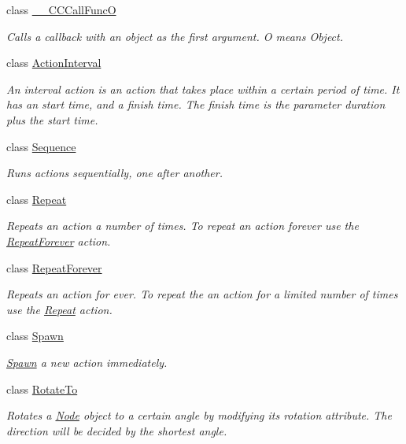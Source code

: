 \begin{DoxyCompactItemize}
class \hyperlink{class____CCCallFuncO}{\+\_\+\+\_\+\+C\+C\+Call\+FuncO}
\begin{DoxyCompactList}\small\item\em Calls a \textquotesingle{}callback\textquotesingle{} with an object as the first argument. O means Object. \end{DoxyCompactList}\item 
class \hyperlink{classActionInterval}{Action\+Interval}
\begin{DoxyCompactList}\small\item\em An interval action is an action that takes place within a certain period of time. It has an start time, and a finish time. The finish time is the parameter duration plus the start time. \end{DoxyCompactList}\item 
class \hyperlink{classSequence}{Sequence}
\begin{DoxyCompactList}\small\item\em Runs actions sequentially, one after another. \end{DoxyCompactList}\item 
class \hyperlink{classRepeat}{Repeat}
\begin{DoxyCompactList}\small\item\em Repeats an action a number of times. To repeat an action forever use the \hyperlink{classRepeatForever}{Repeat\+Forever} action. \end{DoxyCompactList}\item 
class \hyperlink{classRepeatForever}{Repeat\+Forever}
\begin{DoxyCompactList}\small\item\em Repeats an action for ever. To repeat the an action for a limited number of times use the \hyperlink{classRepeat}{Repeat} action. \end{DoxyCompactList}\item 
class \hyperlink{classSpawn}{Spawn}
\begin{DoxyCompactList}\small\item\em \hyperlink{classSpawn}{Spawn} a new action immediately. \end{DoxyCompactList}\item 
class \hyperlink{classRotateTo}{Rotate\+To}
\begin{DoxyCompactList}\small\item\em Rotates a \hyperlink{classNode}{Node} object to a certain angle by modifying it\textquotesingle{}s rotation attribute. The direction will be decided by the shortest angle. \end{DoxyCompactList}\item 

\end{DoxyCompactItemize}
